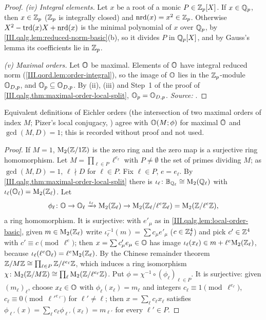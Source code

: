 \begin{proof}
\emph{(iv) Integral elements.} Let $x$ be a root of a monic $P\in\mathbb{Z}_p[X]$. If $x\in\mathbb{Q}_p$, then $x\in\mathbb{Z}_p$ ($\mathbb{Z}_p$ is integrally closed) and $\operatorname{nrd}(x)=x^2\in\mathbb{Z}_p$.
Otherwise $X^2-\operatorname{trd}(x)X+\operatorname{nrd}(x)$ is the minimal polynomial of $x$ over $\mathbb{Q}_p$, by \cref{III.qalg.lem:reduced-norm-basic}(b), so it divides $P$ in $\mathbb{Q}_p[X]$,
and by Gauss's lemma its coefficients lie in $\mathbb{Z}_p$.

\emph{(v) Maximal orders.} Let $\mathbb{O}$ be maximal. Elements of $\mathbb{O}$ have integral reduced norm (\cref{III.qord.lem:order-integral}), so the image of $\mathbb{O}$
lies in the $\mathbb{Z}_p$-module $\mathbb{O}_{D,p}$, and $\mathbb{O}_p\subseteq\mathbb{O}_{D,p}$. By (ii), (iii) and Step~1 of the proof of
\cref{III.qalg.thm:maximal-order-local-split}, $\mathbb{O}_p=\mathbb{O}_{D,p}$. \emph{Source:} \cite[§13.3]{Voi}.
\end{proof}

\begin{theorem}
\end{theorem}
\noindent Equivalent definitions of Eichler orders (the intersection of two maximal orders of index $M$; Pizer's local conjugacy,
\cite[Def.~1.2]{Piz}) agree with $\mathbb{O}(M;\phi)$ for maximal $\mathbb{O}$ and $\gcd(M,D)=1$; this is recorded without proof and not used.
\begin{proof}
If $M=1$, $\mathrm{M}_2(\mathbb{Z}/1\mathbb{Z})$ is the zero ring and the zero map is a surjective ring homomorphism. Let $M=\prod_{\ell\in P}\ell^{e_\ell}$ with $P\ne\emptyset$ the
set of primes dividing $M$; as $\gcd(M,D)=1$, $\ell\nmid D$ for $\ell\in P$. Fix $\ell\in P$, $e=e_\ell$. By
\cref{III.qalg.thm:maximal-order-local-split} there is $\iota_\ell\colon\mathbb{B}_{\mathbb{Q}_\ell}\cong\mathrm{M}_2(\mathbb{Q}_\ell)$ with $\iota_\ell(\mathbb{O}_\ell)=\mathrm{M}_2(\mathbb{Z}_\ell)$. Let
\[
  \phi_\ell\colon\mathbb{O}\to\mathbb{O}_\ell\xrightarrow{\iota_\ell}\mathrm{M}_2(\mathbb{Z}_\ell)\to\mathrm{M}_2(\mathbb{Z}_\ell/\ell^e\mathbb{Z}_\ell)=\mathrm{M}_2(\mathbb{Z}/\ell^e\mathbb{Z}),
\]
a ring homomorphism. It is surjective: with $e'_\mu$ as in \cref{III.qalg.lem:local-order-basic}, given $m\in\mathrm{M}_2(\mathbb{Z}_\ell)$ write $\iota_\ell^{-1}(m)=\sum c_\mu e'_\mu$
($c\in\mathbb{Z}_\ell^4$) and pick $c'\in\mathbb{Z}^4$ with $c'\equiv c\pmod{\ell^e}$; then $x=\sum c'_\mu e_\mu\in\mathbb{O}$ has image $\iota_\ell(x_\ell)\in m+\ell^e\mathrm{M}_2(\mathbb{Z}_\ell)$, because
$\iota_\ell(\ell^e\mathbb{O}_\ell)=\ell^e\mathrm{M}_2(\mathbb{Z}_\ell)$. By the Chinese remainder theorem $\mathbb{Z}/M\mathbb{Z}\cong\prod_{\ell\in P}\mathbb{Z}/\ell^{e_\ell}\mathbb{Z}$, which induces a ring isomorphism
$\chi\colon\mathrm{M}_2(\mathbb{Z}/M\mathbb{Z})\cong\prod_\ell\mathrm{M}_2(\mathbb{Z}/\ell^{e_\ell}\mathbb{Z})$. Put $\phi=\chi^{-1}\circ(\phi_\ell)_{\ell\in P}$. It is surjective: given $(m_\ell)_\ell$, choose
$x_\ell\in\mathbb{O}$ with $\phi_\ell(x_\ell)=m_\ell$ and integers $c_\ell\equiv1\pmod{\ell^{e_\ell}}$, $c_\ell\equiv0\pmod{\ell'^{e_{\ell'}}}$ for $\ell'\ne\ell$; then
$x=\sum_\ell c_\ell x_\ell$ satisfies $\phi_{\ell'}(x)=\sum_\ell c_\ell\phi_{\ell'}(x_\ell)=m_{\ell'}$ for every $\ell'\in P$.
\end{proof}
